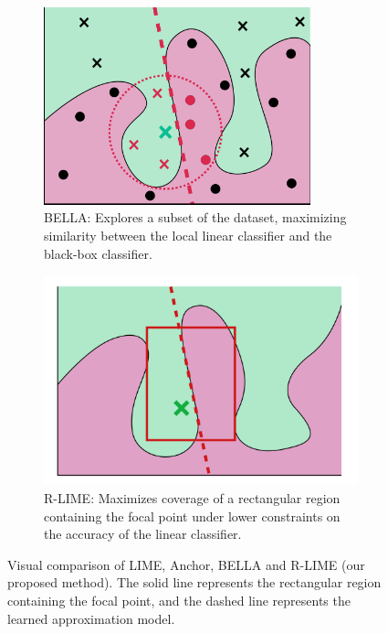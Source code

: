 \documentclass[runningheads]{llncs}
\begin{document}
\begin{figure}[tb]
\begin{subfigure}[t]{0.45\textwidth}
		\centering
		\includegraphics[width=0.85\textwidth]{bella}
		\caption{%
			BELLA: Explores a subset of the dataset,
			maximizing similarity between the local linear classifier
			and the black-box classifier.
		}\label{fig:bella}
	\end{subfigure}
	\hfill
	\begin{subfigure}[t]{0.45\textwidth}
		\centering
		\includegraphics[width=\textwidth]{rlime3}
		\caption{%
			R-LIME:
			Maximizes coverage of a rectangular region containing the focal point
			under lower constraints on the accuracy of the linear classifier.
		}\label{fig:rlime}
	\end{subfigure}
	\caption{%
		Visual comparison of LIME, Anchor, BELLA and R-LIME (our proposed method).
		The solid line represents the rectangular region containing the focal
		point, and the dashed line represents the learned approximation model.
	}
\end{figure}
\end{document}
